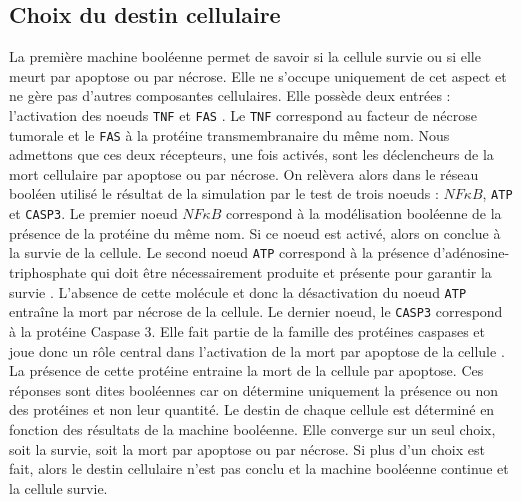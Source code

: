 \documentclass[11pt, a4paper]{article}
\begin{document}
\subsection{Choix du destin cellulaire}
La première machine booléenne permet de savoir si la cellule survie ou si elle
meurt par apoptose ou par nécrose. Elle ne s'occupe uniquement de cet aspect et
ne gère pas d'autres composantes cellulaires. Elle possède deux entrées :
l'activation des noeuds \texttt{TNF} et \texttt{FAS} \cite{calzone2010}. Le
\texttt{TNF} correspond au facteur de nécrose tumorale et le \texttt{FAS} à la
protéine transmembranaire du même nom. Nous admettons que ces deux récepteurs,
une fois activés, sont les déclencheurs de la mort cellulaire par apoptose ou
par nécrose. On relèvera alors dans le réseau booléen utilisé le résultat de la
simulation par le test de trois noeuds : $NF\kappa B$, \texttt{ATP} et
\texttt{CASP3}. Le premier noeud $NF\kappa B$ correspond à la modélisation
booléenne de la présence de la protéine du même nom. Si ce noeud est activé,
alors on conclue à la survie de la cellule. Le second noeud \texttt{ATP}
correspond à la présence d'adénosine-triphosphate qui doit être nécessairement
produite et présente pour garantir la survie \cite{kroemer2007}. L'absence de
cette molécule et donc la désactivation du noeud \texttt{ATP} entraîne la mort
par nécrose de la cellule. Le dernier noeud, le \texttt{CASP3} correspond à la
protéine Caspase 3. Elle fait partie de la famille des protéines caspases et
joue donc un rôle central dans l'activation de la mort par apoptose de la
cellule \cite{porter1999}. La présence de cette protéine entraine la mort de la
cellule par apoptose. Ces réponses sont dites booléennes car on détermine
uniquement la présence ou non des protéines et non leur quantité. Le destin de
chaque cellule est déterminé en fonction des résultats de la machine booléenne.
Elle converge sur un seul choix, soit la survie, soit la mort par apoptose ou
par nécrose. Si plus d'un choix est fait, alors le destin cellulaire n'est pas
conclu et la machine booléenne continue et la cellule survie.
\end{document}
